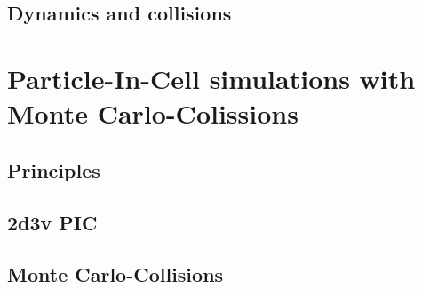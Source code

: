     \subsection{Dynamics and collisions}

  \section{Particle-In-Cell simulations with Monte Carlo-Colissions}

    \subsection{Principles}

    \subsection{2d3v PIC}

    \subsection{Monte Carlo-Collisions}
